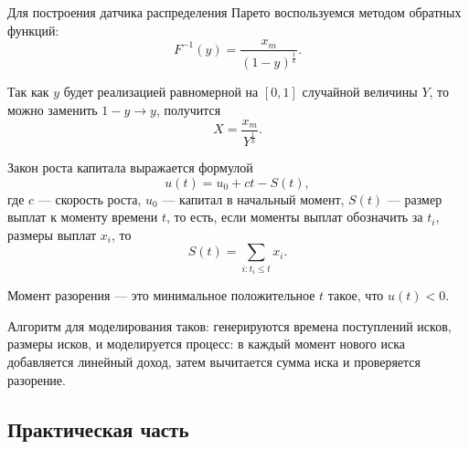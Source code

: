 \documentclass[12pt, a4paper]{article}
\begin{document}
Для построения датчика распределения Парето воспользуемся методом обратных функций: 
\[F^{-1}(y) = \frac{x_m}{(1-y)^{\frac{1}{k}}}.\]

Так как $y$ будет реализацией равномерной на $[0,1]$ случайной величины $Y$, то можно заменить $1-y \to y$, получится 
\[ X = \frac{x_m}{Y^\frac{1}{k}}.\]

Закон роста капитала выражается формулой
\[ u(t) = u_0 + ct - S(t),\]
где $c$ --- скорость роста, $u_0$ --- капитал в начальный момент, $S(t)$ --- размер выплат к моменту времени $t$, то есть, если моменты выплат обозначить за $t_i$, размеры выплат $x_i$, то \[S(t) = \sum\limits_{i:t_i\leqslant t}x_i.\]

Момент разорения --- это минимальное положительное $t$ такое, что $u(t)<0$.

Алгоритм для моделирования таков: генерируются времена поступлений исков, размеры исков, и моделируется процесс: в каждый момент нового иска добавляется линейный доход, затем вычитается сумма иска и проверяется разорение.

\subsection*{Практическая часть}
\end{document}
